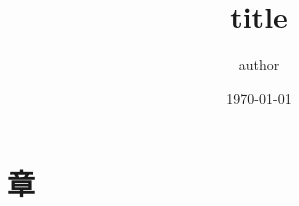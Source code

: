 \documentclass[10pt,a4paper]{ltjsarticle}           %
\begin{document}
\title{title}
\author{author}
\date{\today}
\maketitle

\section{章}
\end{document}
